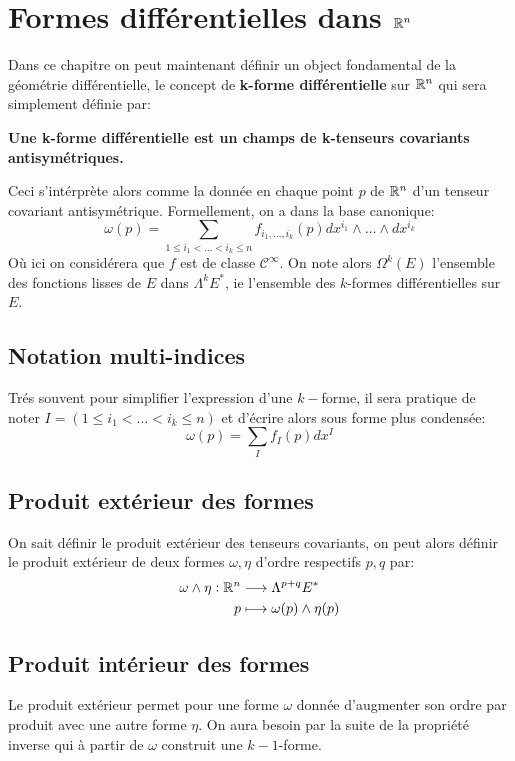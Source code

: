 \chapter{Formes différentielles dans \( \mathbb{R}^n \)}
   Dans ce chapitre on peut maintenant définir un object fondamental de la géométrie différentielle, le concept de \textbf{k-forme différentielle} sur \(\mathbb{R}^n\) qui sera simplement définie par:
   \begin{center}
      \textbf{Une k-forme différentielle est un champs de k-tenseurs covariants antisymétriques.}
   \end{center}
   Ceci s'intérprète alors comme la donnée en chaque point \(p\) de \(\mathbb{R}^n\) d'un tenseur covariant antisymétrique. Formellement, on a dans la base canonique:
   \[
      \omega(p) = \sum_{1 \leq i_1 < \ldots < i_k \leq n} f_{{i_1, \ldots, i_k}}(p) dx^{i_1} \wedge \ldots \wedge dx^{i_k}
   \]
   Où ici on considérera que \(f\) est de classe \( \mathcal{C}^\infty \). On note alors \( \Omega^k(E)\) l'ensemble des fonctions lisses de \( E \) dans \(\Lambda^kE^*\), ie l'ensemble des \( k \)-formes différentielles sur \( E \).
   \section{Notation multi-indices}
   Trés souvent pour simplifier l'expression d'une \( k- \)forme, il sera pratique de noter \(I = (1 \leq i_1 < \ldots < i_k \leq n)\) et d'écrire alors sous forme plus condensée:
   \[ 
      \omega(p) = \sum_I f_{I}(p) dx^I
   \]
   \section{Produit extérieur des formes}
   On sait définir le produit extérieur des tenseurs covariants, on peut alors définir le produit extérieur de deux formes \( \omega, \eta \) d'ordre respectifs \( p, q \) par:
   \[ 
      \begin{aligned}
         \omega \wedge \eta : \mathbb{R}^n &\longrightarrow \Lambda^{p+q}E^* \\
         p &\longmapsto \omega(p) \wedge \eta(p)
      \end{aligned}
   \]
   \section{Produit intérieur des formes}
      Le produit extérieur permet pour une forme \( \omega \) donnée d'augmenter son ordre par produit avec une autre forme \( \eta \). On aura besoin par la suite de la propriété inverse qui à partir de \( \omega \) construit une $k-1$-forme.\<

